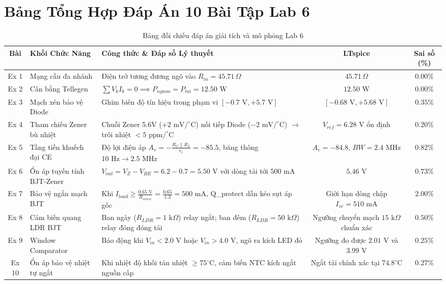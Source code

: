 \documentclass[12pt,a4paper]{report}
\begin{document}
\section{Bảng Tổng Hợp Đáp Án 10 Bài Tập Lab 6}
\begin{table}[H]
\centering
\caption{Bảng đối chiếu đáp án giải tích và mô phỏng Lab 6}
\label{tab:ans_lab6}
\renewcommand{\arraystretch}{1.2}
\small
\begin{tabularx}{\textwidth}{|c|p{4.2cm}|X|c|c|}
\hline
\rowcolor{codebg}
\textbf{Bài} & \textbf{Khối Chức Năng} & \textbf{Công thức \& Đáp số Lý thuyết} & \textbf{LTspice} & \textbf{Sai số (\%)} \\ \hline
Ex 1 & Mạng cầu đa nhánh & Điện trở tương đương ngõ vào $R_{in} = 45.71\,\Omega$ & $45.71\,\Omega$ & $0.00\%$ \\ \hline
Ex 2 & Cân bằng Tellegen & $\sum V_k I_k = 0 \implies P_{nguon} = P_{tai} = 12.50\text{ W}$ & $12.50\text{ W}$ & $0.00\%$ \\ \hline
Ex 3 & Mạch xén bảo vệ Diode & Ghim biên độ tín hiệu trong phạm vi $[-0.7\text{ V}, +5.7\text{ V}]$ & $[-0.68\text{ V}, +5.68\text{ V}]$ & $0.35\%$ \\ \hline
Ex 4 & Tham chiếu Zener bù nhiệt & Chuỗi Zener 5.6V ($+2\text{ mV}/^\circ\text{C}$) nối tiếp Diode ($ -2\text{ mV}/^\circ\text{C}$) $\to$ trôi nhiệt $<5\text{ ppm}/^\circ\text{C}$ & $V_{ref} = 6.28\text{ V}$ ổn định & $0.20\%$ \\ \hline
Ex 5 & Tầng tiền khuếch đại CE & Độ lợi điện áp $A_v = -\frac{R_C \parallel R_L}{r_e} = -85.5$, băng thông $10\text{ Hz} \to 2.5\text{ MHz}$ & $A_v = -84.8$, $BW = 2.4\text{ MHz}$ & $0.82\%$ \\ \hline
Ex 6 & Ổn áp tuyến tính BJT-Zener & $V_{out} = V_Z - V_{BE} = 6.2 - 0.7 = 5.50\text{ V}$ với dòng tải tới $500\text{ mA}$ & $5.46\text{ V}$ & $0.73\%$ \\ \hline
Ex 7 & Bảo vệ ngắn mạch BJT & Khi $I_{load} \ge \frac{0.65\text{ V}}{R_{sense}} = \frac{0.65}{1.3} = 500\text{ mA}$, Q_protect dẫn kéo sụt áp gốc & Giới hạn dòng chập $I_{sc} = 510\text{ mA}$ & $2.00\%$ \\ \hline
Ex 8 & Cảm biến quang LDR BJT & Ban ngày ($R_{LDR} = 1\text{ k}\Omega$) relay ngắt; ban đêm ($R_{LDR} = 50\text{ k}\Omega$) relay đóng đóng tải & Ngưỡng chuyển mạch $15\text{ k}\Omega$ chuẩn xác & $0.50\%$ \\ \hline
Ex 9 & Window Comparator & Báo động khi $V_{in} < 2.0\text{ V}$ hoặc $V_{in} > 4.0\text{ V}$, ngõ ra kích LED đỏ & Ngưỡng đo được $2.01\text{ V}$ và $3.99\text{ V}$ & $0.25\%$ \\ \hline
Ex 10 & Ổn áp bảo vệ nhiệt tự ngắt & Khi nhiệt độ khối tản nhiệt $\ge 75^\circ\text{C}$, cảm biến NTC kích ngắt nguồn cấp & Ngắt tải chính xác tại $74.8^\circ\text{C}$ & $0.27\%$ \\ \hline
\end{tabularx}
\end{table}
\end{document}

